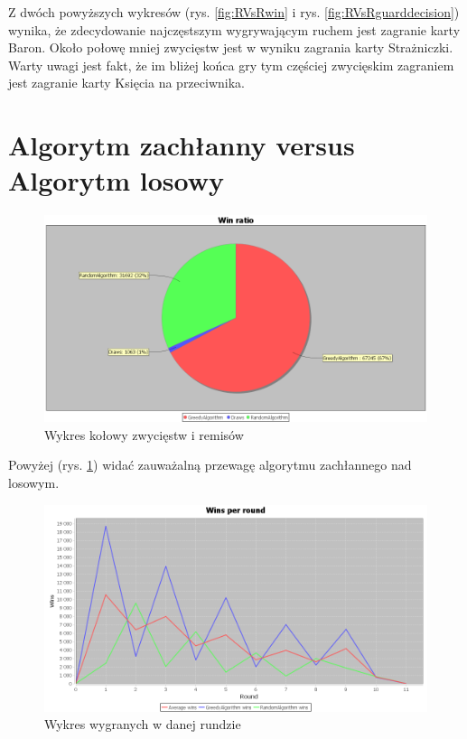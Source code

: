 Z dwóch powyższych wykresów (rys. \ref{fig:RVsRwin} i rys. \ref{fig:RVsRguarddecision}) wynika, że zdecydowanie najczęstszym wygrywającym ruchem jest zagranie karty Baron. Około połowę mniej zwycięstw jest w wyniku zagrania karty Strażniczki. Warty uwagi jest fakt, że im bliżej końca gry tym częściej zwycięskim zagraniem jest zagranie karty Księcia na przeciwnika.

\section{Algorytm zachłanny versus Algorytm losowy}

\begin{figure}[H]
	\centering
	\includegraphics[width=\textwidth]{Resources/GVsR/GVsRwin.PNG}
	\caption{Wykres kołowy zwycięstw i remisów} 
	\label{fig:GVsRwin}
\end{figure}

Powyżej (rys. \ref{fig:GVsRwin}) widać zauważalną przewagę algorytmu zachłannego nad losowym.

\begin{figure}[H]
	\centering
	\includegraphics[width=\textwidth]{Resources/GVsR/GVsRroundwin.PNG}
	\caption{Wykres wygranych w danej rundzie} 
	\label{fig:GVsRroundwin}
\end{figure}

